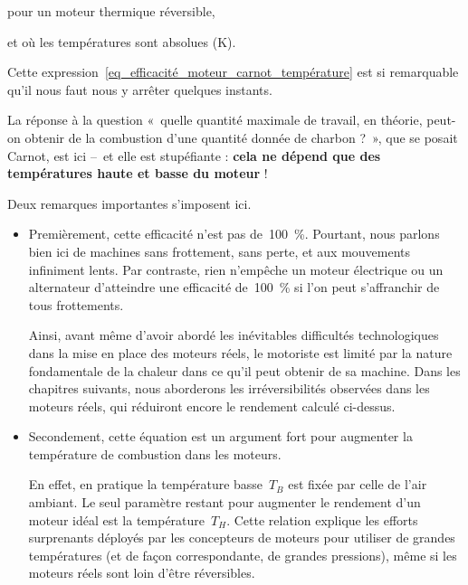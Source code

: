 		\begin{equationterms}
			\item pour un moteur thermique réversible,
			\item et où les températures sont absolues (\si{\kelvin}).
		\end{equationterms}

		Cette expression~\ref{eq_efficacité_moteur_carnot_température} est si remarquable qu’il nous faut nous y arrêter quelques instants.

		La réponse à la question «~quelle quantité maximale de travail, en théorie, peut-on obtenir de la combustion d’une quantité donnée de charbon ?~», que se posait Carnot, est ici --\ et elle est stupéfiante : \textbf{cela ne dépend que des températures haute et basse du moteur} !

		Deux remarques importantes s’imposent ici.

		\begin{itemize}
			\item Premièrement, cette efficacité n’est pas de~\SI{100}{\percent}. Pourtant, nous parlons bien ici de machines sans frottement, sans perte, et aux mouvements infiniment lents. Par contraste, rien n’empêche un moteur électrique ou un alternateur d’atteindre une efficacité de~\SI{100}{\percent} si l’on peut s’affranchir de tous frottements. 

			Ainsi, avant même d’avoir abordé les inévitables difficultés technologiques dans la mise en place des moteurs réels, le motoriste est limité par la nature fondamentale de la chaleur dans ce qu’il peut obtenir de sa machine. Dans les chapitres suivants, nous aborderons les irréversibilités observées dans les moteurs réels, qui réduiront encore le rendement calculé ci-dessus.

			\item Secondement, cette équation est un argument fort pour augmenter la température de combustion dans les moteurs.

			En effet, en pratique la température basse~$T_B$ est fixée par celle de l’air ambiant. Le seul paramètre restant pour augmenter le rendement d’un moteur idéal est la température~$T_H$. Cette relation explique les efforts surprenants déployés par les concepteurs de moteurs pour utiliser de grandes températures (et de façon correspondante, de grandes pressions), même si les moteurs réels sont loin d’être réversibles.

		\end{itemize}

